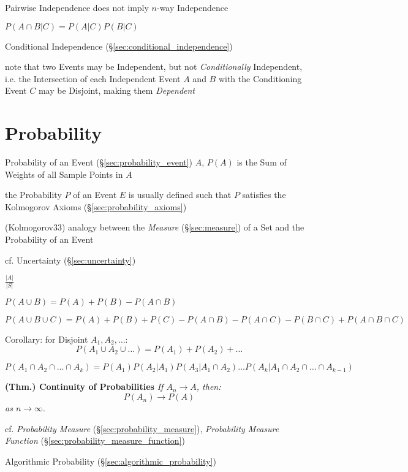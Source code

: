 Pairwise Independence does not imply $n$-way Independence

$P(A \cap B | C) = P(A|C)P(B|C)$

\fist Conditional Independence (\S\ref{sec:conditional_independence})

note that two Events may be Independent, but not \emph{Conditionally}
Independent, i.e. the Intersection of each Independent Event $A$ and $B$ with
the Conditioning Event $C$ may be Disjoint, making them \emph{Dependent}



\section{Probability}\label{sec:probability}

Probability of an Event (\S\ref{sec:probability_event}) $A$, $P(A)$ is the Sum
of Weights of all Sample Points in $A$

the Probability $P$ of an Event $E$ is usually defined such that $P$ satisfies
the Kolmogorov Axioms (\S\ref{sec:probability_axioms})

(Kolmogorov33) analogy between the \emph{Measure} (\S\ref{sec:measure}) of a Set
and the Probability of an Event

cf. Uncertainty (\S\ref{sec:uncertainty})

$\frac{|A|}{|S|}$

$P(A \cup B) = P(A) + P(B) - P(A \cap B)$

$P(A \cup B \cup C) = P(A) + P(B) + P(C) - P(A \cap B) - P(A \cap C) -
P(B \cap C) + P(A \cap B \cap C)$

Corollary: for Disjoint $A_1, A_2, \ldots$:
\[
  P(A_1 \cup A_2 \cup \ldots) = P(A_1) + P(A_2) + \ldots
\]

$P(A_1 \cap A_2 \cap \ldots \cap A_k) = P(A_1) P(A_2 | A_1) P(A_3 |
A_1 \cap A_2) \ldots P(A_k | A_1 \cap A_2 \cap \ldots \cap A_{k-1})$

\textbf{(Thm.) Continuity of Probabilities} \emph{If $A_n \rightarrow A$, then:}
\[
  P(A_n) \rightarrow P(A)
\]
\emph{as $n \rightarrow \infty$}.

cf. \emph{Probability Measure} (\S\ref{sec:probability_measure}),
\emph{Probability Measure Function} (\S\ref{sec:probability_measure_function})

\fist Algorithmic Probability (\S\ref{sec:algorithmic_probability})


